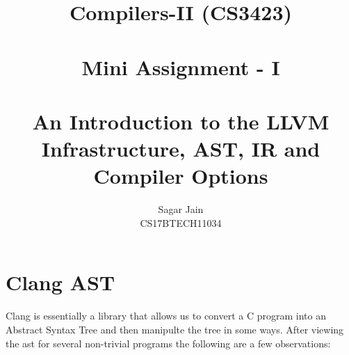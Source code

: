 \documentclass[12pt]{article}
\begin{document}
\title{\textbf{Compilers-II  (CS3423)}\\~\\Mini Assignment - I\\~\\An Introduction to the LLVM Infrastructure, AST, IR and Compiler Options}
\author{Sagar Jain\\CS17BTECH11034}
\maketitle
\begin{normalsize}
\tableofcontents
\end{normalsize}
\newpage
\section{Clang AST}
Clang is essentially a library that allows us to convert a  C program into an Abstract Syntax Tree and then manipulte the tree in some ways.
After viewing the ast for several non-trivial programs the following are a few observations:
\end{document}
